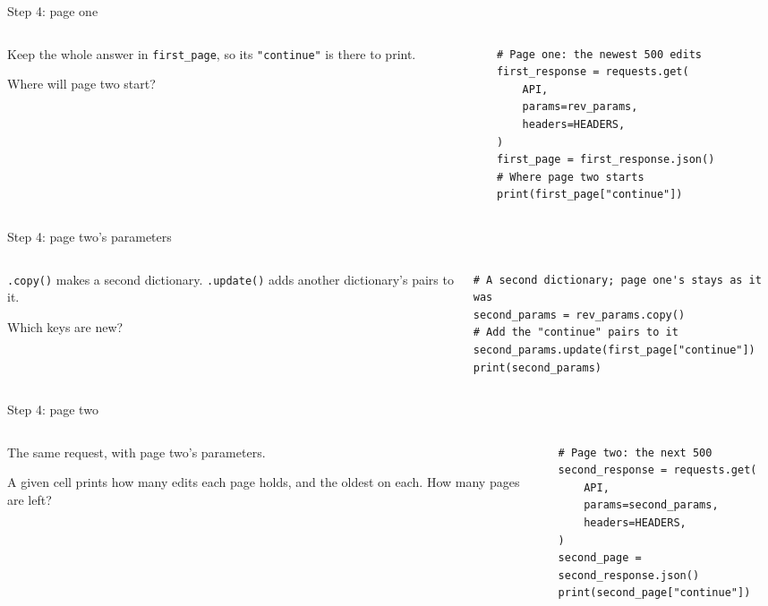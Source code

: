 \documentclass[9pt,aspectratio=169]{beamer}
\begin{document}
\begin{frame}[fragile]{Step 4: page one}
    \begin{columns}[T]
        \begin{column}{0.37\textwidth}
            Keep the whole answer in \texttt{first\_page}, so its \texttt{"continue"} is there to print.

            \medskip
            Where will page two start?
        \end{column}
        \begin{column}{0.6\textwidth}
\begin{lstlisting}
# Page one: the newest 500 edits
first_response = requests.get(
    API,
    params=rev_params,
    headers=HEADERS,
)
first_page = first_response.json()
# Where page two starts
print(first_page["continue"])
\end{lstlisting}
        \end{column}
    \end{columns}
\end{frame}

\begin{frame}[fragile]{Step 4: page two's parameters}
    \begin{columns}[T]
        \begin{column}{0.37\textwidth}
            \texttt{.copy()} makes a second dictionary. \texttt{.update()} adds another dictionary's pairs to it.

            \medskip
            Which keys are new?
        \end{column}
        \begin{column}{0.6\textwidth}
\begin{lstlisting}
# A second dictionary; page one's stays as it was
second_params = rev_params.copy()
# Add the "continue" pairs to it
second_params.update(first_page["continue"])
print(second_params)
\end{lstlisting}
        \end{column}
    \end{columns}
\end{frame}

\begin{frame}[fragile]{Step 4: page two}
    \begin{columns}[T]
        \begin{column}{0.37\textwidth}
            The same request, with page two's parameters.

            \medskip
            A given cell prints how many edits each page holds, and the oldest on each. How many pages are left?
        \end{column}
        \begin{column}{0.6\textwidth}
\begin{lstlisting}
# Page two: the next 500
second_response = requests.get(
    API,
    params=second_params,
    headers=HEADERS,
)
second_page = second_response.json()
print(second_page["continue"])
\end{lstlisting}
        \end{column}
    \end{columns}
\end{frame}
\end{document}
